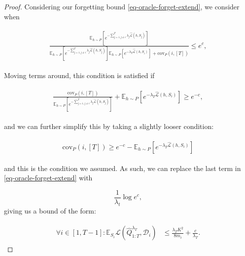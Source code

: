 \documentclass{article}
\theoremstyle{plain}
\theoremstyle{definition}
\theoremstyle{remark}
\begin{document}
\begin{proof}
Considering our forgetting bound \eqref{eq-oracle-forget-extend}, we consider when 

\begin{align*} 
\begin{split}
\frac{\mathbb{E}_{h\sim P}\left [e^{-\sum_{j=1,j\neq i}^{T}\lambda_j\hat{\mathcal{L}}(h,S_j)} \right ]}{\mathbb{E}_{h\sim P}\left [e^{-\sum_{j=1,j\neq i}^{T}\lambda_j\hat{\mathcal{L}}(h,S_j)} \right ]\mathbb{E}_{h\sim P}\left [e^{-\lambda_T\hat{\mathcal{L}}(h,S_i)} \right ]+\mathrm{cov}_{P}(i, [T])} \leq e^{c},
\end{split}
\end{align*}

Moving terms around, this condition is satisfied if

\begin{align*} 
\begin{split}
\frac{\mathrm{cov}_{P}(i, [T])}{\mathbb{E}_{h\sim P}\left [e^{-\sum_{j=1,j\neq i}^{T}\lambda_j\hat{\mathcal{L}}(h,S_j)} \right ]}+\mathbb{E}_{h\sim P}\left [e^{-\lambda_T\hat{\mathcal{L}}(h,S_i)} \right ]
 \geq e^{-c},
\end{split}
\end{align*}

and we can further simplify this by taking a slightly looser condition:

\begin{align*} 
\begin{split}
\mathrm{cov}_{P}(i, [T])
 \geq e^{-c}-\mathbb{E}_{h\sim P}\left [e^{-\lambda_T\hat{\mathcal{L}}(h,S_i)} \right ]
\end{split}
\end{align*}

and this is the condition we assumed. As such, we can replace the last term in \eqref{eq-oracle-forget-extend} with 

$$\frac{1}{\lambda_t}\log e^{c},$$
giving us a bound of the form:

\begin{align} \label{eq-oracle-forget-extend-best}
\begin{split}
\forall i\in[1,T-1]:
\mathbb{E}_{S_i}\mathcal{L}(\hat{Q}^{\lambda_T}_{1:T}, \mathcal{D}_i) &\leq \frac{\lambda_T K^2}{8m_i}+\frac{c}{\lambda_T}.
\end{split}
\end{align}

\end{proof}

\newpage
\end{document}
